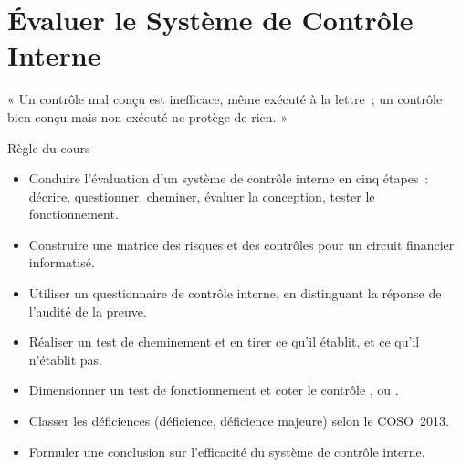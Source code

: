 
\chapter{Évaluer le Système de Contrôle Interne}
\label{chap:eval-sci}

\epigraph{%
    « Un contrôle mal conçu est inefficace, même exécuté à la lettre~; un
    contrôle bien conçu mais non exécuté ne protège de rien. »%
}{Règle du cours}


\begin{boxobjectifs}
\begin{itemize}
    \item Conduire l'évaluation d'un système de contrôle interne en cinq
          étapes~: décrire, questionner, cheminer, évaluer la conception,
          tester le fonctionnement.
    \item Construire une matrice des risques et des contrôles pour un
          circuit financier informatisé.
    \item Utiliser un questionnaire de contrôle interne, en distinguant la
          réponse de l'audité de la preuve.
    \item Réaliser un test de cheminement et en tirer ce qu'il établit, et
          ce qu'il n'établit pas.
    \item Dimensionner un test de fonctionnement et coter le contrôle
          \OUI{}, \NON{} ou \NEK{}.
    \item Classer les déficiences (déficience, déficience majeure) selon le
          COSO~2013.
    \item Formuler une conclusion sur l'efficacité du système de contrôle
          interne.
\end{itemize}
\end{boxobjectifs}

